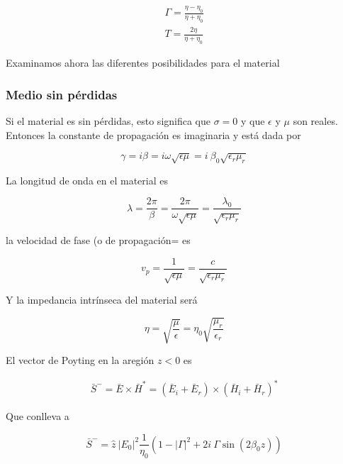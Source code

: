 \begin{eqnarray*}
\Gamma = \frac{\eta - \eta_0}{\eta + \eta_0} \\
T = \frac{2\eta}{\eta + \eta_0}
\end{eqnarray*}

Examinamos ahora las diferentes posibilidades para el material

\subsubsection*{Medio sin pérdidas}

Si el material es sin pérdidas, esto significa que $\sigma=0$ y que $\epsilon$ y $\mu$ son reales. Entonces la constante de propagación es imaginaria y está dada por 

\begin{equation*}
\gamma = i \beta = i \omega \sqrt{\epsilon \mu} = i \ \beta_0 \sqrt{\epsilon_r \mu_r}
\end{equation*}

La longitud de onda en el material es

\begin{equation*}
\lambda = \frac{2 \pi}{\beta} = \frac{2 \pi}{\omega \sqrt{\epsilon \mu}} = \frac{\lambda_0}{\sqrt{\epsilon_r \mu_r}}
\end{equation*}

la velocidad de fase (o de propagación= es 

\begin{equation*}
v_p = \frac{1}{ \sqrt{\epsilon \mu}} = \frac{c}{ \sqrt{\epsilon_r \mu_r}}
\end{equation*}

 Y la impedancia intrínseca del material será


\begin{equation*}
\eta = \sqrt{\frac{\mu}{\epsilon}} = \eta_0 \sqrt{\frac{\mu_r}{\epsilon_r}}
\end{equation*}

El vector de Poyting en la aregión $z<0$ es

\begin{eqnarray*}
\bar{S}^{-} = \bar{E} \times \bar{H}^* = (\bar{E}_i+\bar{E}_r) \times (\bar{H}_i+\bar{H}_r)^*
\end{eqnarray*}

Que conlleva a 

\begin{equation*}
\bar{S}^{-} = \hat{z} \ |E_0|^2 \frac{1}{\eta_0} \left(1-|\Gamma|^2 + 2 i \ \Gamma \sin (2 \beta_0 z)\right)
\end{equation*}

